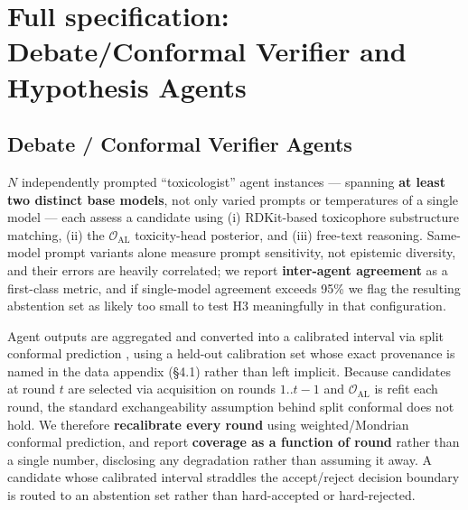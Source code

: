 \documentclass{article}
\begin{document}
\appendix

\section{Full specification: Debate/Conformal Verifier and Hypothesis Agents}

\subsection{Debate / Conformal Verifier Agents}

$N$ independently prompted ``toxicologist'' agent instances --- spanning
\textbf{at least two distinct base models}, not only varied prompts or
temperatures of a single model --- each assess a candidate using (i)
RDKit-based toxicophore substructure matching, (ii) the
$\mathcal{O}_{\text{AL}}$ toxicity-head posterior, and (iii) free-text
reasoning. Same-model prompt variants alone measure prompt sensitivity, not
epistemic diversity, and their errors are heavily correlated; we report
\textbf{inter-agent agreement} as a first-class metric, and if
single-model agreement exceeds 95\% we flag the resulting abstention set as
likely too small to test H3 meaningfully in that configuration.

Agent outputs are aggregated and converted into a calibrated interval via
split conformal prediction \citep{angelopoulos2023}, using a held-out
calibration set whose exact provenance is named in the data appendix
(\S4.1) rather than left implicit. Because candidates at round $t$ are
selected via acquisition on rounds $1..t-1$ and $\mathcal{O}_{\text{AL}}$
is refit each round, the standard exchangeability assumption behind split
conformal does not hold. We therefore \textbf{recalibrate every round}
using weighted/Mondrian conformal prediction, and report \textbf{coverage
as a function of round} rather than a single number, disclosing any
degradation rather than assuming it away. A candidate whose calibrated
interval straddles the accept/reject decision boundary is routed to an
abstention set rather than hard-accepted or hard-rejected.
\end{document}
